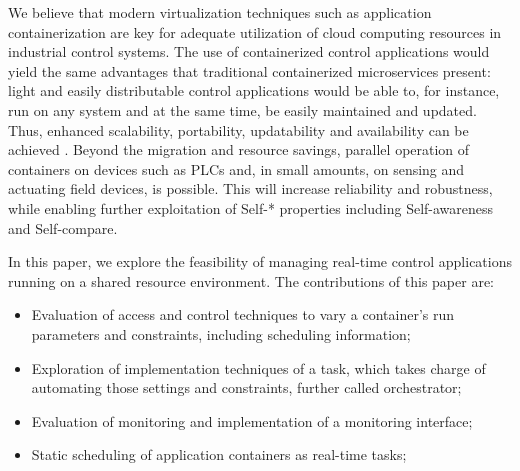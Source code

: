 \documentclass[]{scrartcl}
\begin{document}
We believe that modern virtualization techniques such as application containerization \cite{Mogaetal2016,Tascietal2018,GoldschmidtHauck-Stattelmann2016} are key for adequate utilization of cloud computing resources in industrial control systems.
The use of containerized control applications would yield the same advantages that traditional containerized microservices present: light and easily distributable control applications would be able to, for instance, run on any system and at the same time, be easily maintained and updated. 
Thus, enhanced scalability, portability, updatability and availability can be achieved \cite{Fazioetal2016}.
Beyond the migration and resource savings, parallel operation of containers on devices such as PLCs and, in small amounts, on sensing and actuating field devices, is possible. 
This will increase reliability and robustness, while enabling further exploitation of Self-* properties including Self-awareness and Self-compare.

In this paper, we explore the feasibility of managing real-time control applications running on a shared resource environment.
The contributions of this paper are: 
\begin{itemize}
	\item Evaluation of access and control techniques to vary a container's run parameters and constraints, including scheduling information;
	
	\item Exploration of implementation techniques of a task, which takes charge of automating those settings and constraints, further called orchestrator;
	
	\item Evaluation of monitoring and implementation of a monitoring interface;
	
	\item Static scheduling of application containers as real-time tasks;

		
\end{itemize}
\end{document}
